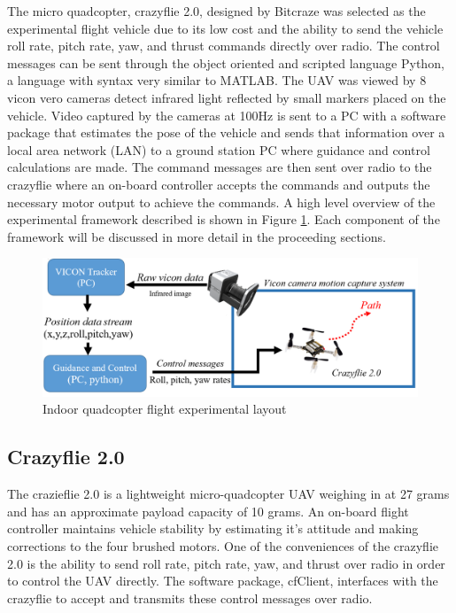 \documentclass[numbered,pdftex]{ohio-etd}
\begin{document}
The micro quadcopter, crazyflie 2.0, designed by Bitcraze was selected as the experimental flight vehicle due to its low cost and the ability to send the vehicle roll rate, pitch rate, yaw, and thrust commands directly over radio. The control messages can be sent through the object oriented and scripted language Python, a language with syntax very similar to MATLAB. The UAV was viewed by 8 vicon vero cameras detect infrared light reflected by small markers placed on the vehicle. Video captured by the cameras at 100Hz is sent to a PC with a software package that estimates the pose of the vehicle and sends that information over a local area network (LAN) to a ground station PC where guidance and control calculations are made. The command messages are then sent over radio to the crazyflie where an on-board controller accepts the commands and outputs the necessary motor output to achieve the commands. A high level overview of the experimental framework described is shown in Figure \ref{fig:experimentalFramework}. Each component of the framework will be discussed in more detail in the proceeding sections. 

\begin{figure}
	\centering
	\includegraphics[trim=0 0 0 0,clip,width=15cm]{PaperFigures/Methods/experimentalSetup}
	\caption{Indoor quadcopter flight experimental layout}
	\label{fig:experimentalFramework}
\end{figure}

\subsection{Crazyflie 2.0}
The crazieflie 2.0 is a lightweight micro-quadcopter UAV weighing in at 27 grams and has an approximate payload capacity of 10 grams. An on-board flight controller maintains vehicle stability by estimating it's attitude and making corrections to the four brushed motors. One of the conveniences of the crazyflie 2.0 is the ability to send roll rate, pitch rate, yaw, and thrust over radio in order to control the UAV directly. The software package, cfClient, interfaces with the crazyflie to accept and transmits these control messages over radio. 
\end{document}
